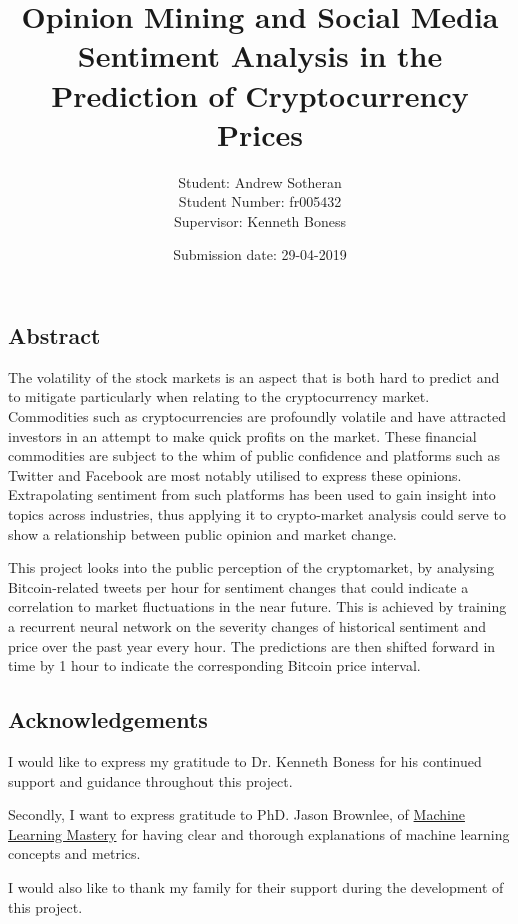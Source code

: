 \documentclass[oneside, 12pt]{article}
\title{Opinion Mining and Social Media Sentiment Analysis in the Prediction of Cryptocurrency Prices}
\date{Submission date: 29-04-2019}
\author{Student: Andrew Sotheran
	\\Student Number: fr005432
	\\Supervisor: Kenneth Boness}
\begin{document}
	
	\maketitle
	
	\vspace*{\fill}
	\begin{center}
		\section{Abstract}\label{abstract}
	\end{center}
		The volatility of the stock markets is an aspect that is both hard to predict and to mitigate particularly when relating to the cryptocurrency market. Commodities such as cryptocurrencies are profoundly volatile and have attracted investors in an attempt to make quick profits on the market. These financial commodities are subject to the whim of public confidence and platforms such as Twitter and Facebook are most notably utilised to express these opinions. Extrapolating sentiment from such platforms has been used to gain insight into topics across industries, thus applying it to crypto-market analysis could serve to show a relationship between public opinion and market change. 
		
		This project looks into the public perception of the cryptomarket, by analysing Bitcoin-related tweets per hour for sentiment changes that could indicate a correlation to market fluctuations in the near future. This is achieved by training a recurrent neural network on the severity changes of historical sentiment and price over the past year every hour. The predictions are then shifted forward in time by 1 hour to indicate the corresponding Bitcoin price interval.

	
	\newpage
	\begin{center}
		\section{Acknowledgements}\label{acknowledgements}
		I would like to express my gratitude to Dr. Kenneth Boness for his continued support and guidance throughout this project.  
		
		Secondly, I want to express gratitude to PhD. Jason Brownlee, of \href{machinelearningmastery.com}{Machine Learning Mastery} for having clear and thorough explanations of machine learning concepts and metrics.
		
		I would also like to thank my family for their support during the development of this project.
		
	\end{center}
	
\end{document}
